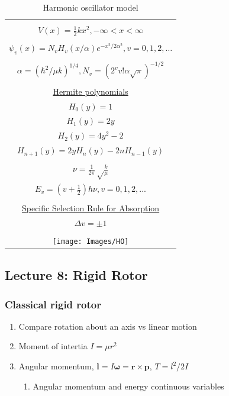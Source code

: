 \documentclass[11pt]{article}
\begin{document}
\begin{table}[]
   \begin{center}
   \caption{Harmonic oscillator model}
    \label{Harmonic-oscillator}
\begin{tabular}[h]{|c|}
\hline
 \\
$\displaystyle       V(x) = \frac{1}{2} k x^2, -\infty < x < \infty $ \\
 \\
$\displaystyle     \psi_v(x) = N_v H_v(x/\alpha)e^{-x^2/2\alpha^2}, v = 0, 1, 2, \ldots $ \\
\\
$\displaystyle \alpha=(\hbar^2/\mu k)^{1/4}, N_v=(2^vv!\alpha\sqrt{\pi})^{-1/2} $ \\
 \\
\underline{Hermite polynomials} \\
$\displaystyle H_0(y) =1$\\
$\displaystyle H_1(y) = 2y$\\
$\displaystyle H_2(y) = 4y^2-2$\\
$\displaystyle H_{n+1}(y) = 2 y H_n(y) -2 n H_{n-1}(y)$\\
 \\
$\displaystyle     \nu =\frac{1}{2\pi}\sqrt\frac{k}{\mu}$ \\
$\displaystyle     E_v=(v+\frac{1}{2})h \nu, v=0, 1, 2, ...$ \\

\\ \underline{Specific Selection Rule for Absorption} \\
$\displaystyle \Delta v = \pm 1$
 \\
 \\
     \texttt{[image: Images/HO]} \\       
\hline
\end{tabular}
 \end{center}
\end{table}

\subsection{Lecture 8: Rigid Rotor}
\label{sec:org321b5a4}
\subsubsection{Classical rigid rotor}
\label{sec:org4190c30}
\begin{enumerate}
\item Compare rotation about an axis vs linear motion
\item Moment of intertia \(I=\mu r^2\)
\item Angular momentum, \(\mathbf{l} = I \mathbf{\omega} = \mathbf{r}\times \mathbf{p}\), \(T= l^2/2I\) 
\begin{enumerate}
\item Angular momentum and energy continuous variables
\end{enumerate}
\end{enumerate}
\end{document}
